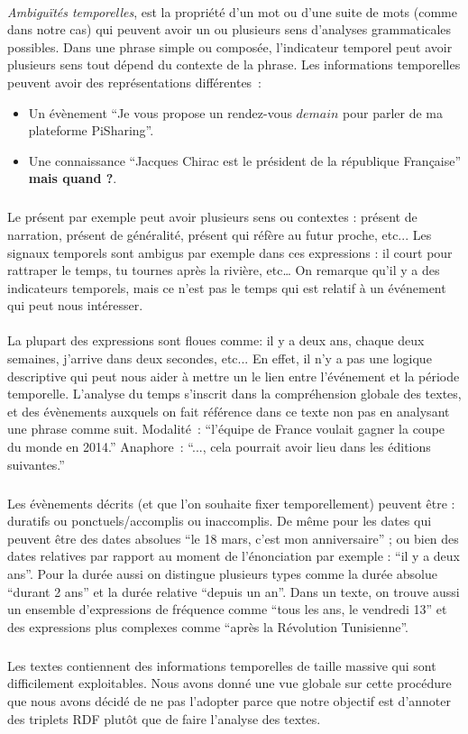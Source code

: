 \paragraph{}
{\it Ambiguïtés temporelles}, est la propriété d'un mot ou d'une suite de mots (comme dans notre cas) qui peuvent avoir un ou plusieurs sens d'analyses grammaticales possibles. Dans une phrase simple ou composée, l'indicateur temporel peut avoir plusieurs sens tout dépend du contexte de la phrase. Les informations temporelles peuvent avoir des représentations différentes~: 
\begin{itemize}
\item Un évènement ``Je vous propose un rendez-vous $demain$ pour parler de ma plateforme PiSharing''. \item Une connaissance ``Jacques Chirac est le président de la république Française'' \textbf{ mais quand ?}.
\end{itemize}

\subparagraph{} 
Le présent par exemple peut avoir plusieurs sens ou contextes : présent de narration, présent de généralité, présent qui réfère au futur proche, etc...
Les signaux temporels sont ambigus par exemple dans ces expressions : il court pour rattraper le temps, tu tournes après la rivière, etc… On remarque qu'il y a des indicateurs temporels, mais ce n'est pas le temps qui est relatif à un événement qui peut nous intéresser.
\paragraph{}
La plupart des expressions sont floues comme: il y a deux ans, chaque deux semaines, j’arrive dans deux secondes, etc... En effet, il n'y a pas une logique descriptive qui peut nous aider à mettre un le lien entre l'événement et la période temporelle. L’analyse du temps s’inscrit dans la compréhension globale des textes, et des évènements auxquels on fait référence dans ce texte non pas en analysant une phrase comme suit. 
\newline
Modalité~: ``l’équipe de France voulait gagner la coupe du monde en 2014.'' 
\newline
Anaphore~:  ``..., cela pourrait avoir lieu dans les éditions suivantes.''
\subparagraph{}
Les évènements décrits (et que l’on souhaite fixer temporellement) peuvent être : duratifs ou ponctuels/accomplis ou inaccomplis. 
De même pour les dates qui peuvent être des dates absolues ``le 18 mars, c'est mon anniversaire'' ; ou bien des dates relatives par rapport au moment de l’énonciation par exemple : ``il y a deux ans''. Pour la durée aussi on distingue plusieurs types comme la durée absolue ``durant 2 ans'' et la durée relative ``depuis un an''. Dans un texte, on trouve aussi un ensemble d'expressions de fréquence comme ``tous les ans, le vendredi 13'' et des expressions plus complexes comme ``après la Révolution Tunisienne''.
\subparagraph{}
Les textes contiennent des informations temporelles de taille massive qui sont difficilement exploitables. Nous avons donné une vue globale sur cette procédure que nous avons décidé de ne pas l'adopter parce que notre objectif est d'annoter des triplets RDF plutôt que de faire l'analyse des textes.
